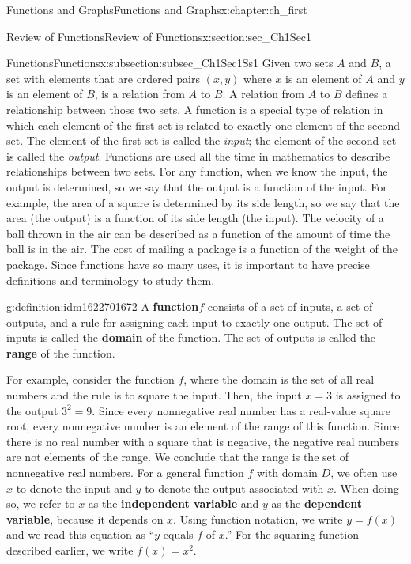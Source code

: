 \documentclass[oneside,10pt,]{book}
\newcommand{\terminology}[1]{\textbf{#1}}
\numberwithin{equation}{section}
\begin{document}
\begin{chapterptx}{Functions and Graphs}{}{Functions and Graphs}{}{}{x:chapter:ch_first}
\begin{sectionptx}{Review of Functions}{}{Review of Functions}{}{}{x:section:sec_Ch1Sec1}
\begin{subsectionptx}{Functions}{}{Functions}{}{}{x:subsection:subsec_Ch1Sec1Ss1}
Given two sets \(A\) and \(B\), a set with elements that are ordered pairs \((x,y) \) where \(x\) is an element of \(A\) and \(y\) is an element of \(B\), is a relation from \(A\)   to \(B\). A relation from \(A\) to \(B\) defines a relationship between those two sets. A function is a special type of relation in which each element of the first set is related to exactly one element of the second set. The element of the first set is called the \emph{input}; the element of the second set is called the \emph{output}. Functions are used all the time in mathematics to describe relationships between two sets. For any function, when we know the input, the output is determined, so we say that the output is a function of the input. For example, the area of a square is determined by its side length, so we say that the area (the output) is a function of its side length (the input). The velocity of a ball thrown in the air can be described as a function of the amount of time the ball is in the air. The cost of mailing a package is a function of the weight of the package. Since functions have so many uses, it is important to have precise definitions and terminology to study them.%
\begin{definition}{}{g:definition:idm1622701672}%
A \terminology{function}\(f\) consists of a set of inputs, a set of outputs, and a rule for assigning each input to exactly one output. The set of inputs is called the \terminology{domain} of the function. The set of outputs is called the \terminology{range} of the function.\end{definition}
For example, consider the function \(f\), where the domain is the set of all real numbers and the rule is to square the input. Then, the input \(x=3\) is assigned to the output \(3^2=9\). Since every nonnegative real number has a real-value square root, every nonnegative number is an element of the range of this function. Since there is no real number with a square that is negative, the negative real numbers are not elements of the range. We conclude that the range is the set of nonnegative real numbers. For a general function \(f\) with domain \(D\), we often use \(x\) to denote the input and \(y\) to denote the output associated with \(x\). When doing so, we refer to \(x\) as the \terminology{independent variable} and \(y\) as the \terminology{dependent variable}, because it depends on \(x\). Using function notation, we write \(y=f(x)\) and we read this equation as “\(y\) equals \(f\) of \(x\).” For the squaring function described earlier, we write \(f(x)=x^2.\)%
\par

\end{subsectionptx}
\end{sectionptx}
\end{chapterptx}
\end{document}
